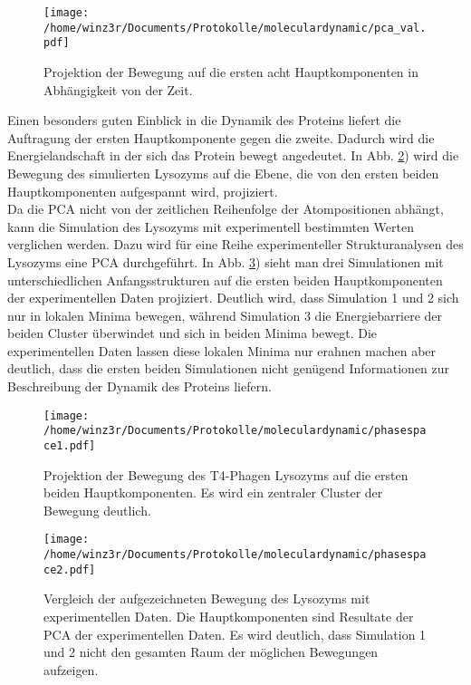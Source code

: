 \begin{figure}
\centering
\texttt{[image: /home/winz3r/Documents/Protokolle/moleculardynamic/pca\_val.pdf]}\caption{\centering Projektion der Bewegung auf die ersten acht Hauptkomponenten in Abhängigkeit von der Zeit.}\label{fig:pca_comp}
\end{figure}

Einen besonders guten Einblick in die Dynamik des Proteins liefert die Auftragung der ersten Hauptkomponente gegen die zweite. Dadurch wird die Energielandschaft in der sich das Protein bewegt angedeutet. In Abb. \ref{fig:phasespace1}) wird die Bewegung des simulierten Lysozyms auf die Ebene, die von den ersten beiden Hauptkomponenten aufgespannt wird, projiziert.
\\ \noindent
Da die PCA nicht von der zeitlichen Reihenfolge der Atompositionen abhängt, kann die Simulation des Lysozyms mit experimentell bestimmten Werten verglichen werden.
Dazu wird für eine Reihe experimenteller Strukturanalysen des Lysozyms eine PCA durchgeführt.
In Abb. \ref{fig:exp}) sieht man drei Simulationen mit unterschiedlichen Anfangsstrukturen auf die ersten beiden Hauptkomponenten der experimentellen Daten projiziert.
Deutlich wird, dass Simulation 1 und 2 sich nur in lokalen Minima bewegen, während Simulation 3 die Energiebarriere der beiden Cluster überwindet und sich in beiden Minima bewegt.
Die experimentellen Daten lassen diese lokalen Minima nur erahnen machen aber deutlich, dass die ersten beiden Simulationen nicht genügend Informationen zur Beschreibung der Dynamik des Proteins liefern.

\begin{figure}
\centering
\texttt{[image: /home/winz3r/Documents/Protokolle/moleculardynamic/phasespace1.pdf]}\caption{Projektion der Bewegung des T4-Phagen Lysozyms auf die ersten beiden Hauptkomponenten. Es wird ein zentraler Cluster der Bewegung deutlich.}\label{fig:phasespace1}
\end{figure}

\begin{figure}
\centering
\texttt{[image: /home/winz3r/Documents/Protokolle/moleculardynamic/phasespace2.pdf]}\caption{Vergleich der aufgezeichneten Bewegung des Lysozyms mit experimentellen Daten. Die Hauptkomponenten sind Resultate der PCA der experimentellen Daten. Es wird deutlich, dass Simulation 1 und 2 nicht den gesamten Raum der möglichen Bewegungen aufzeigen.}\label{fig:exp}
\end{figure}
